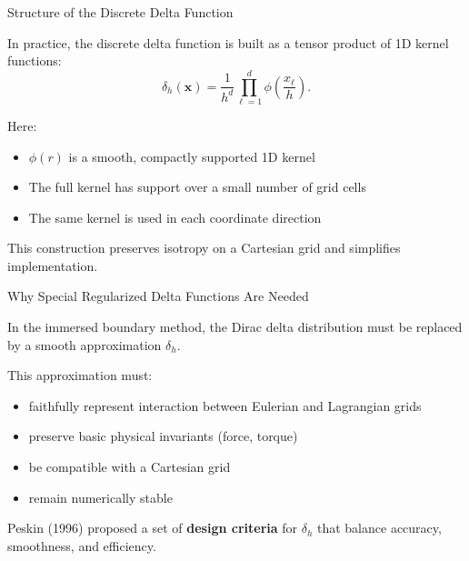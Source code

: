 \documentclass{beamer}
\begin{document}
\begin{frame}{Structure of the Discrete Delta Function}

In practice, the discrete delta function is built as a tensor product of
1D kernel functions:
\[
\delta_h(\mathbf{x})
=
\frac{1}{h^d}
\prod_{\ell=1}^{d}
\phi\!\left(\frac{x_\ell}{h}\right).
\]

\medskip

Here:
\begin{itemize}
    \item $\phi(r)$ is a smooth, compactly supported 1D kernel
    \item The full kernel has support over a small number of grid cells
    \item The same kernel is used in each coordinate direction
\end{itemize}

\medskip

This construction preserves isotropy on a Cartesian grid and simplifies implementation.

\end{frame}

\begin{frame}{Why Special Regularized Delta Functions Are Needed}

In the immersed boundary method, the Dirac delta distribution
must be replaced by a smooth approximation $\delta_h$.

\medskip

This approximation must:
\begin{itemize}
    \item faithfully represent interaction between Eulerian and Lagrangian grids
    \item preserve basic physical invariants (force, torque)
    \item be compatible with a Cartesian grid
    \item remain numerically stable
\end{itemize}

\medskip

Peskin (1996) proposed a set of \textbf{design criteria} for $\delta_h$
that balance accuracy, smoothness, and efficiency.

\end{frame}
\end{document}
